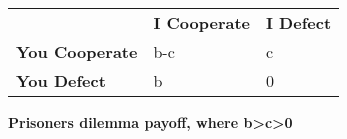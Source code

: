 \begin{table}[h]
\begin{tabular}{lll}
             & \textbf{I Cooperate} & \textbf{I Defect} \\
\textbf{You Cooperate} & b-c         & c        \\
\textbf{You Defect}    & b           & 0       
\end{tabular}
\end{table}

\textbf{Prisoners dilemma payoff, where b>c>0}